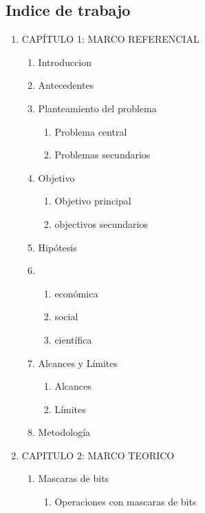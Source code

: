 \documentclass[11pt]{extarticle}
\begin{document}
\subsection{Indice de trabajo}
  \begin{enumerate}
    \item CAPÍTULO 1: MARCO REFERENCIAL
    \begin{enumerate}
      \item Introduccion
      \item Antecedentes
      \item Planteamiento del problema
        \begin{enumerate}
          \item Problema central
          \item Problemas secundarios
        \end{enumerate}
      \item Objetivo
        \begin{enumerate}
          \item Objetivo principal
          \item objectivos secundarios
        \end{enumerate}
      \item Hip\'otesis
      \item \justificacion
        \begin{enumerate}
          \item \justificacion econ\'omica
          \item \justificacion social
          \item \justificacion cient\'ifica
        \end{enumerate}
      \item Alcances y L\'imites
        \begin{enumerate}
          \item Alcances
          \item L\'imites
        \end{enumerate}
      \item Metodolog\'ia
    \end{enumerate}
    \item CAPITULO 2: MARCO TEORICO
      \begin{enumerate}
        \item Mascaras de bits
        \begin{enumerate}
          \item Operaciones con mascaras de bits
        \end{enumerate}

\end{enumerate}
\end{enumerate}
\end{document}
